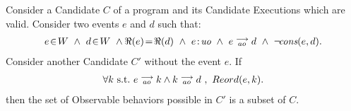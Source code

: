 \begin{corollary}
    \label{CorolWriteElim}
    Consider a Candidate $C$ of a program and its Candidate Executions which are valid. 
    Consider two events $e$ and $d$ such that:
    \begin{align*}
        \event{e}{W} \ \wedge \ \event{d}{W} \ \wedge \Re(e)\!=\!\Re(d) \ \wedge \ \et{e}{uo} \ \wedge \ \reln{e}{ao}{d} \ \wedge \ \neg\!\cons{e}{d}. 
    \end{align*} 
    Consider another Candidate $C'$ without the event $e$. 
    If
    \begin{align*}
        \forall k \ \text{s.t.} \ e\stackrel{\longrightarrow}{_{ao}}k \wedge k\stackrel{\longrightarrow}{_{ao}}d \ , \ Reord(e, k).
    \end{align*}
    then the set of Observable behaviors possible in $C'$ is a subset of $C$.
\end{corollary}

